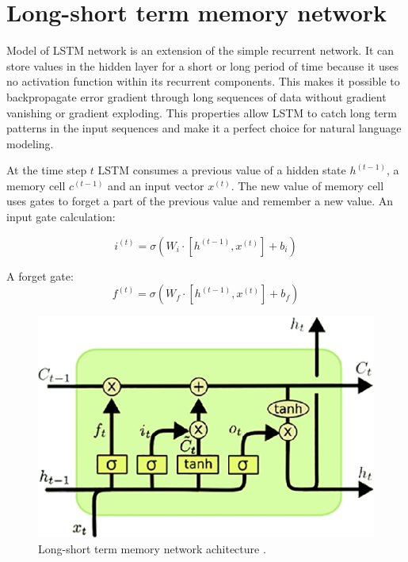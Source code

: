\section{Long-short term memory network}
Model of LSTM network is an extension of the simple recurrent network. It can store values in the hidden layer for a short or long period of time because it uses no activation function within its recurrent components. This makes it possible to backpropagate error gradient through long sequences of data without gradient vanishing or gradient exploding. This properties allow LSTM to catch long term patterns in the input sequences and make it a perfect choice for natural language modeling.

At the time step $t$ LSTM consumes a previous value of a hidden state $h^{(t-1)}$, a memory cell $c^{(t-1)}$ and an input vector $x^{(t)}$. The new value of memory cell uses gates to forget a part of the previous value and remember a new value. An input gate calculation:

\begin{equation}
i^{(t)}=\sigma(W_i\cdot[h^{(t-1)}, x^{(t)}]+b_i)
\label{lstm:input}
\end{equation} 

A forget gate:
\begin{equation}
f^{(t)} = \sigma(W_f\cdot[h^{(t-1)},x^{(t)}] + b_f)
\label{lstm:ft}
\end{equation} 

\begin{figure}[h]
\centering
\includegraphics{Figures/lstm}
\decoRule
\caption[Long-short term memory]{Long-short term memory network achitecture \parencite{lstm-picture}.}
\label{fig:word_embeddings}
\end{figure}


